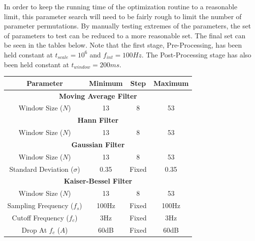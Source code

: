         In order to keep the running time of the optimization routine to a reasonable limit, this parameter search will need to be fairly rough to limit the number of parameter permutations. By manually testing extremes of the parameters, the set of parameters to test can be reduced to a more reasonable set. The final set can be seen in the tables below. Note that the first stage, Pre-Processing, has been held constant at $t_{scale}=10^6$ and $f_{int}=100Hz$. The Post-Processing stage has also been held constant at $t_{window}=200ms$. 


        \begin{center}
            \begin{tabular}{|c|c|c|c|}
                \hline
                Parameter & Minimum & Step & Maximum \\
                \hline
                \multicolumn{4}{|c|}{\textbf{Moving Average Filter}} \\
                \hline
                Window Size ($N$) & 13 & 8 & 53 \\
                \hline
                \multicolumn{4}{|c|}{\textbf{Hann Filter}} \\
                \hline
                Window Size ($N$) & 13 & 8 & 53 \\
                \hline
                \multicolumn{4}{|c|}{\textbf{Gaussian Filter}} \\
                \hline
                Window Size ($N$) & 13 & 8 & 53 \\
                Standard Deviation ($\sigma$) & 0.35 & Fixed & 0.35 \\
                \hline
                \multicolumn{4}{|c|}{\textbf{Kaiser-Bessel Filter}} \\
                \hline
                Window Size ($N$) & 13 & 8 & 53 \\
                Sampling Frequency ($f_s$) & 100Hz & Fixed & 100Hz \\
                Cutoff Frequency ($f_c$) & 3Hz & Fixed & 3Hz \\
                Drop At $f_c$ ($A$) & 60dB & Fixed & 60dB \\
                \hline
            \end{tabular}
        \end{center}

